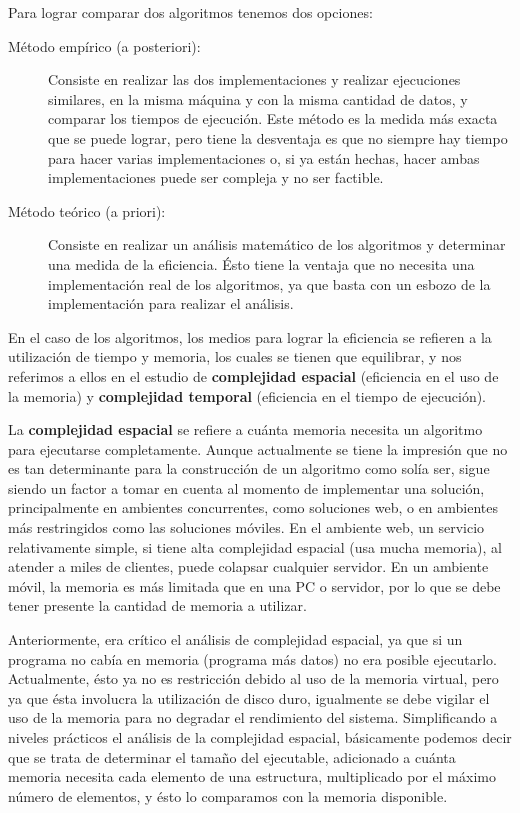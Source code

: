 Para lograr comparar dos algoritmos tenemos dos opciones:
\begin{description}
\item[Método empírico (a posteriori): ] Consiste en realizar las dos
  implementaciones y realizar ejecuciones similares, en la misma
  máquina y con la misma cantidad de datos, y comparar los tiempos de
  ejecución. Este método es la medida más exacta que se puede lograr,
  pero tiene la desventaja es que no siempre hay tiempo para hacer
  varias implementaciones o, si ya están hechas, hacer ambas
  implementaciones puede ser compleja y no ser factible.
\item[Método teórico (a priori): ] Consiste en realizar un análisis
  matemático de los algoritmos y determinar una medida de la
  eficiencia. Ésto tiene la ventaja que no necesita una implementación
  real de los algoritmos, ya que basta con un esbozo de la
  implementación para realizar el análisis.
\end{description}

En el caso de los algoritmos, los medios para lograr la eficiencia se
refieren a la utilización de tiempo y memoria, los cuales se tienen
que equilibrar, y nos referimos a ellos en el estudio de
\textbf{complejidad espacial} (eficiencia en el uso de la memoria) y
\textbf{complejidad temporal} (eficiencia en el tiempo de ejecución).

La \textbf{complejidad espacial} se refiere a cuánta memoria necesita
un algoritmo para ejecutarse completamente.  Aunque actualmente se
tiene la impresión que no es tan determinante para la construcción de
un algoritmo como solía ser, sigue siendo un factor a tomar en cuenta
al momento de implementar una solución, principalmente en ambientes
concurrentes, como soluciones web, o en ambientes más restringidos
como las soluciones móviles.  En el ambiente web, un servicio
relativamente simple, si tiene alta complejidad espacial (usa mucha
memoria), al atender a miles de clientes, puede colapsar cualquier
servidor.  En un ambiente móvil, la memoria es más limitada que en una
PC o servidor, por lo que se debe tener presente la cantidad de
memoria a utilizar.

Anteriormente, era crítico el análisis de complejidad espacial, ya que
si un programa no cabía en memoria (programa más datos) no era posible
ejecutarlo.  Actualmente, ésto ya no es restricción debido al uso de
la memoria virtual, pero ya que ésta involucra la utilización de disco
duro, igualmente se debe vigilar el uso de la memoria para no degradar
el rendimiento del sistema.  Simplificando a niveles prácticos el
análisis de la complejidad espacial, básicamente podemos decir que se
trata de determinar el tamaño del ejecutable, adicionado a cuánta
memoria necesita cada elemento de una estructura, multiplicado por el
máximo número de elementos, y ésto lo comparamos con la memoria
disponible.

